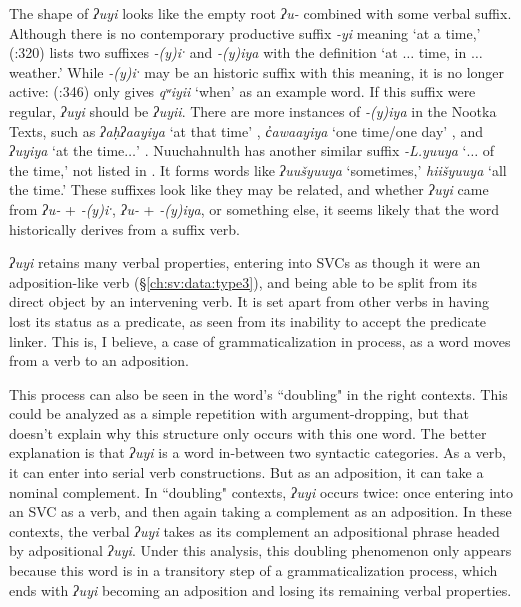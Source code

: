 The shape of \textit{ʔuyi} looks like the empty root \textit{ʔu-} combined with some verbal suffix. Although there is no contemporary productive suffix \textit{-yi} meaning `at a time,' \citeauthor{sapir1939} (\citeyear{sapir1939}:320) lists two suffixes \textit{-(y)iˑ} and \textit{-(y)iya} with the definition `at $\ldots$ time, in $\ldots$ weather.' While \textit{-(y)iˑ} may be an historic suffix with this meaning, it is no longer active: \citeauthor{stonham2005} (\citeyear{stonham2005}:346) only gives \textit{qʷiyii} `when' as an example word. If this suffix were regular, \textit{ʔuyi} should be \textit{ʔuyii}. There are more instances of \textit{-(y)iya} in the Nootka Texts, such as \textit{ʔaḥʔaayiya} `at that time' \citep[16]{sapir1939}, \textit{c̓awaayiya} `one time/one day' \citep[19]{sapir1939}, and \textit{ʔuyiya} `at the time$\ldots$' \citep[112]{sapir1939}. Nuuchahnulth has another similar suffix \textit{-L.yuuya} `$\ldots$ of the time,' not listed in \cite{sapir1939}. It forms words like \textit{ʔuušyuuya} `sometimes,' \textit{hiišyuuya} `all the time.' These suffixes look like they may be related, and whether \textit{ʔuyi} came from \textit{ʔu-} + \textit{-(y)iˑ}, \textit{ʔu-} + \textit{-(y)iya}, or something else, it seems likely that the word historically derives from a suffix verb.

\textit{ʔuyi} retains many verbal properties, entering into SVCs as though it were an adposition-like verb (\S\ref{ch:sv:data:type3}), and being able to be split from its direct object by an intervening verb. It is set apart from other verbs in having lost its status as a predicate, as seen from its inability to accept the predicate linker. This is, I believe, a case of grammaticalization in process, as a word moves from a verb to an adposition.

This process can also be seen in the word's ``doubling" in the right contexts. This could be analyzed as a simple repetition with argument-dropping, but that doesn't explain why this structure only occurs with this one word. The better explanation is that \textit{ʔuyi} is a word in-between two syntactic categories. As a verb, it can enter into serial verb constructions. But as an adposition, it can take a nominal complement. In ``doubling" contexts, \textit{ʔuyi} occurs twice: once entering into an SVC as a verb, and then again taking a complement as an adposition. In these contexts, the verbal \textit{ʔuyi} takes as its complement an adpositional phrase headed by adpositional \textit{ʔuyi}. Under this analysis, this doubling phenomenon only appears because this word is in a transitory step of a grammaticalization process, which ends with \textit{ʔuyi} becoming an adposition and losing its remaining verbal properties.

